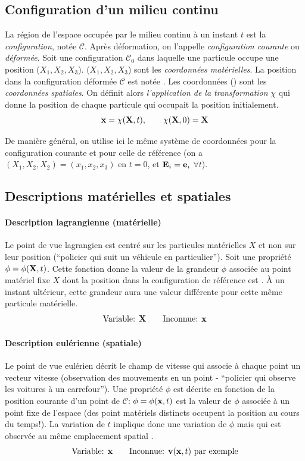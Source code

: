 \subsection{Configuration d'un milieu continu}
La région de l'espace occupée par le milieu continu à un instant $t$ est la \emph{configuration}, notée $\mathcal{C}$. Après déformation, on l'appelle \emph{configuration courante} ou \emph{déformée}. Soit une configuration $\mathcal{C}_0$ dans laquelle une particule occupe une position ($X_1, X_2, X_3$). ($X_1, X_2, X_3$) sont les \emph{coordonnées matérielles}. La position dans la configuration déformée $\mathcal{C}$ est notée . Les coordonnées () sont les \emph{coordonnées spatiales}. On définit alors \emph{l'application de la transformation} $\chi$ qui donne la position  de chaque particule qui occupait la position  initialement.
$$\textbf{x}=\chi(\textbf{X},t),\qquad \chi(\textbf{X},0)=\textbf{X}$$

De manière général, on utilise ici le même système de coordonnées pour la configuration courante et pour celle de référence (on a $(X_1, X_2, X_2)=(x_1, x_2, x_3)$ en $t=0$, et $\textbf{E}_i=\textbf{e}_i$ $\forall t$).

\subsection{Descriptions matérielles et spatiales}
\paragraph{Description lagrangienne (matérielle)}
Le point de vue lagrangien est centré sur les particules matérielles $X$ et non sur leur position (``policier qui suit un véhicule en particulier''). Soit une propriété $\phi=\phi(\textbf{X},t)$. Cette fonction donne la valeur de la grandeur $\phi$ associée au point matériel fixe $X$ dont la position dans la configuration de référence est . \`A un instant ultérieur, cette grandeur aura une valeur différente pour cette même particule matérielle.
 $$\text{Variable: } \textbf{X}\qquad \text{Inconnue: }\textbf{x}$$

 \paragraph{Description eulérienne (spatiale)}
Le point de vue eulérien décrit le champ de vitesse qui associe à chaque point un vecteur vitesse (observation des mouvements en un point - ``policier qui observe les voitures à un carrefour''). Une propriété $\phi$ est décrite en fonction de la position courante  d'un point de $\mathcal{C}$: $\phi=\phi(\textbf{x},t)$ est la valeur de $\phi$ associée à un point fixe  de l'espace (des point matériels distincts occupent la position  au cours du temps!). La variation de $t$ implique donc une variation de $\phi$ mais qui est observée au même emplacement spatial .
$$\text{Variable: }\textbf{x}\qquad\text{Inconnue: }\textbf{v}(\textbf{x},t)\text{ par exemple}$$

